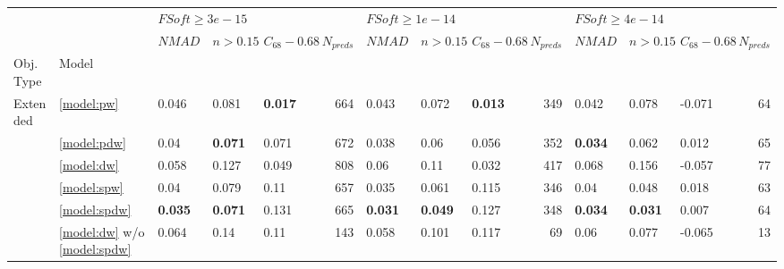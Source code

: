 \documentclass[fleqn,usenatbib]{mnras}
\begin{document}
\begin{table}
	\begin{tabular}{lllllrlllrlllr}
            \hline
                       &    & \multicolumn{4}{l}{$FSoft \geq 3e-15$} & \multicolumn{4}{l}{$FSoft \geq 1e-14$} & \multicolumn{4}{l}{$FSoft \geq 4e-14$} \\
                       &    &             $NMAD$ &        $n>0.15$ &  $C_{68} - 0.68$ & $N_{preds}$ &             $NMAD$ &        $n>0.15$ & $C_{68} - 0.68$ & $N_{preds}$ &             $NMAD$ &        $n>0.15$ &  $C_{68} - 0.68$ & $N_{preds}$ \\
            Obj. Type & Model &                    &                 &                  &             &                    &                 &                 &             &                    &                 &                  &             \\
            \hline
            Extended & \ref{model:pw} &              0.046 &           0.081 &   \textbf{0.017} &         664 &              0.043 &           0.072 &  \textbf{0.013} &         349 &              0.042 &           0.078 &           -0.071 &          64 \\
                       & \ref{model:pdw} &               0.04 &  \textbf{0.071} &            0.071 &         672 &              0.038 &            0.06 &           0.056 &         352 &     \textbf{0.034} &           0.062 &            0.012 &          65 \\
                       & \ref{model:dw} &              0.058 &           0.127 &            0.049 &         808 &               0.06 &            0.11 &           0.032 &         417 &              0.068 &           0.156 &           -0.057 &          77 \\
                       & \ref{model:spw} &               0.04 &           0.079 &             0.11 &         657 &              0.035 &           0.061 &           0.115 &         346 &               0.04 &           0.048 &            0.018 &          63 \\
                       & \ref{model:spdw} &     \textbf{0.035} &  \textbf{0.071} &            0.131 &         665 &     \textbf{0.031} &  \textbf{0.049} &           0.127 &         348 &     \textbf{0.034} &  \textbf{0.031} &            0.007 &          64 \\
                       & \ref{model:dw} w/o \ref{model:spdw} &              0.064 &            0.14 &             0.11 &         143 &              0.058 &           0.101 &           0.117 &          69 &               0.06 &           0.077 &           -0.065 &          13 \\

\end{tabular}
\end{table}
\end{document}
